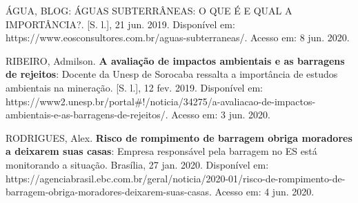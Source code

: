 \documentclass[a4paper, 12pt]{article}
\begin{document}
	\noindent ÁGUA, BLOG: ÁGUAS SUBTERRÂNEAS: O QUE É E QUAL A IMPORTÂNCIA?. [S. l.], 21 jun. 2019. Disponível em: https://www.eosconsultores.com.br/aguas-subterraneas/. Acesso em: 8 jun. 2020.
	
	\vspace{.5cm}
	\noindent RIBEIRO, Admilson. \textbf{A avaliação de impactos ambientais e as barragens de rejeitos}: Docente da Unesp de Sorocaba ressalta a importância de estudos ambientais na mineração. [S. l.], 12 fev. 2019. Disponível em: https://www2.unesp.br/portal\#!/noticia/34275/a-avaliacao-de-impactos-ambientais-e-as-barragens-de-rejeitos/. Acesso em: 3 jun. 2020.
	
	\vspace{.5cm}
	\noindent RODRIGUES, Alex. \textbf{Risco de rompimento de barragem obriga moradores a deixarem suas casas}: Empresa responsável pela barragem no ES está monitorando a situação. Brasília, 27 jan. 2020. Disponível em: https://agenciabrasil.ebc\newline.com.br/geral/noticia/2020-01/risco-de-rompimento-de-barragem-obriga-moradores-deixarem-suas-casas. Acesso em: 4 jun. 2020.
\end{document}
